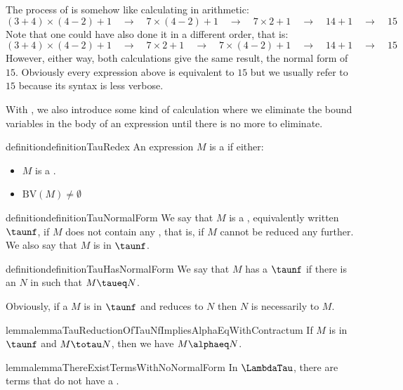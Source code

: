 The process of \betareduction is somehow like calculating in arithmetic:
\[
    (3 + 4) \times (4 - 2) + 1 \quad\to\quad 7 \times (4 - 2) + 1 \quad\to\quad 7 \times 2 + 1 \quad\to\quad 14 + 1 \quad\to\quad 15
\]
Note that one could have also done it in a different order, that is:
\[
    (3 + 4) \times (4 - 2) + 1 \quad\to\quad 7 \times 2 + 1 \quad\to\quad 7 \times (4 - 2) + 1 \quad\to\quad 14 + 1 \quad\to\quad 15
\]
However, either way, both calculations give the same result, the normal form of $15$. Obviously every expression above is equivalent to $15$ but we usually refer to $15$ because its syntax is less verbose.

With \taureduction, we also introduce some kind of calculation where we eliminate the bound variables in the body of an expression until there is no more to eliminate.

\begin{reusable}{definition}{definitionTauRedex}
    An expression $M$ is a \tauredex if either:
    \begin{itemize}
        \item $M$ is a \betaredex.
        \item $\text{BV}(M) \ne \emptyset$
    \end{itemize}
\end{reusable}

\begin{reusable}{definition}{definitionTauNormalForm}
    We say that $M$ is a \taunormalform, equivalently written $\taunf$, if $M$ does not contain any \tauredex, that is, if $M$ cannot be reduced any further. We also say that $M$ is in $\taunf$.
\end{reusable}

\begin{reusable}{definition}{definitionTauHasNormalForm}
    We say that $M$ has a $\taunf$ if there is an $N$ in \taunormalform such that $M \taueq N$.
\end{reusable}

Obviously, if a $M$ is in $\taunf$ and reduces to $N$ then $N$ is necessarily \alphaequivalent to $M$.

\begin{reusableWithProof}{lemma}{lemmaTauReductionOfTauNfImpliesAlphaEqWithContractum}
    If $M$ is in $\taunf$ and $M \totau N$, then we have $M \alphaeq N$.
\end{reusableWithProof}

\begin{reusable}{lemma}{lemmaThereExistTermsWithNoNormalForm}
    In $\LambdaTau$, there are terms that do not have a \taunormalform.
\end{reusable}

